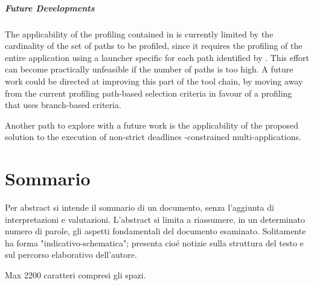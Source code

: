 \paragraph{Future Developments}
The applicability of the profiling contained in \tool is currently limited by the  cardinality of the set of paths to be profiled, since it requires the profiling of the entire application using a launcher specific for each path identified by \dSymb. This effort can  become practically unfeasible if the number of paths is too high. A future work could be directed at improving this part of the tool chain, by moving away from the current profiling path-based selection criteria in favour of a profiling  that uses branch-based criteria.

Another path to explore with a future work is the applicability of the proposed solution to the execution of non-strict deadlines \qos-constrained multi-\plans applications.

\vfill
\newpage
{}
\chapter*{Sommario}
Per abstract si intende il sommario di un documento, senza l'aggiunta di interpretazioni e valutazioni. L'abstract si limita a riassumere, in un determinato numero di parole, gli aspetti fondamentali del documento esaminato. Solitamente ha forma "indicativo-schematica"; presenta cioé notizie sulla struttura del testo e sul percorso elaborativo dell'autore.

Max 2200 caratteri compresi gli spazi.

\endgroup